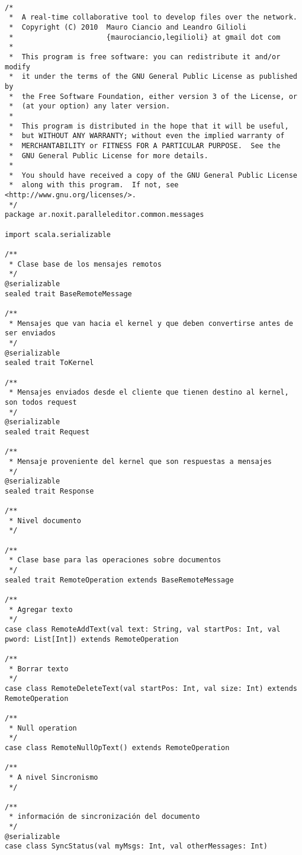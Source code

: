 {
\tiny
\begin{verbatim}

/*
 *  A real-time collaborative tool to develop files over the network.
 *  Copyright (C) 2010  Mauro Ciancio and Leandro Gilioli
 *                      {maurociancio,legilioli} at gmail dot com
 *
 *  This program is free software: you can redistribute it and/or modify
 *  it under the terms of the GNU General Public License as published by
 *  the Free Software Foundation, either version 3 of the License, or
 *  (at your option) any later version.
 *
 *  This program is distributed in the hope that it will be useful,
 *  but WITHOUT ANY WARRANTY; without even the implied warranty of
 *  MERCHANTABILITY or FITNESS FOR A PARTICULAR PURPOSE.  See the
 *  GNU General Public License for more details.
 *
 *  You should have received a copy of the GNU General Public License
 *  along with this program.  If not, see <http://www.gnu.org/licenses/>.
 */
package ar.noxit.paralleleditor.common.messages

import scala.serializable

/**
 * Clase base de los mensajes remotos
 */
@serializable
sealed trait BaseRemoteMessage

/**
 * Mensajes que van hacia el kernel y que deben convertirse antes de ser enviados
 */
@serializable
sealed trait ToKernel

/**
 * Mensajes enviados desde el cliente que tienen destino al kernel, son todos request
 */
@serializable
sealed trait Request

/**
 * Mensaje proveniente del kernel que son respuestas a mensajes
 */
@serializable
sealed trait Response

/**
 * Nivel documento
 */

/**
 * Clase base para las operaciones sobre documentos
 */
sealed trait RemoteOperation extends BaseRemoteMessage

/**
 * Agregar texto
 */
case class RemoteAddText(val text: String, val startPos: Int, val pword: List[Int]) extends RemoteOperation

/**
 * Borrar texto
 */
case class RemoteDeleteText(val startPos: Int, val size: Int) extends RemoteOperation

/**
 * Null operation
 */
case class RemoteNullOpText() extends RemoteOperation

/**
 * A nivel Sincronismo
 */

/**
 * información de sincronización del documento
 */
@serializable
case class SyncStatus(val myMsgs: Int, val otherMessages: Int)


\end{verbatim}}
